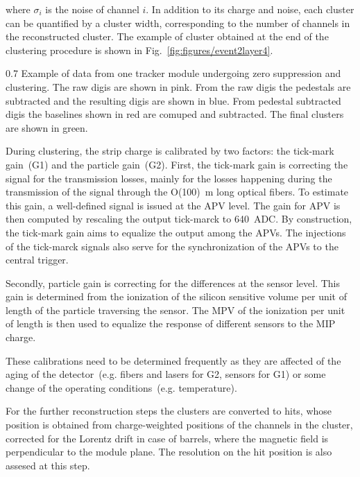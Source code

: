 where $\sigma_{i}$ is the noise of channel $i$. In addition to its charge and noise, each cluster can be quantified by a cluster width, corresponding to the number of channels in the reconstructed cluster. The example of cluster obtained at the end of the clustering procedure is shown in Fig.~\ref{fig:figures/event2layer4}.

                 {0.7}       %
                 {Example of data from one tracker module undergoing zero suppression and clustering. The raw digis are shown in pink. From the raw digis the pedestals are subtracted and the resulting digis are shown in blue. From pedestal subtracted digis the baselines shown in red are comuped and subtracted. The final clusters are shown in green.} %


During clustering, the strip charge is calibrated by two factors: the tick-mark gain~(G1) and the particle gain~(G2). First, the tick-mark gain is correcting the signal for the transmission losses, mainly for the losses happening during the transmission of the signal through the O(100)~m long optical fibers. To estimate this gain, a well-defined signal is issued at the APV level. The gain for APV is then computed by rescaling the output tick-marck to 640~ADC. By construction, the tick-mark gain aims to equalize the output among the APVs. The injections of the tick-marck signals also serve for the synchronization of the APVs to the central trigger.

Secondly, particle gain is correcting for the differences at the sensor level. This gain is determined from the ionization of the silicon sensitive volume per unit of length of the particle traversing the sensor. The MPV of the ionization per unit of length is then used to equalize the response of different sensors to the MIP charge. 

These calibrations need to be determined frequently as they are affected of the aging of the detector~(e.g. fibers and lasers for G2,  sensors for G1) or some change of the operating conditions~(e.g. temperature).

For the further reconstruction steps the clusters are converted to hits, whose position is obtained from charge-weighted positions of the channels in the cluster, corrected for the Lorentz drift in case of barrels, where the magnetic field is perpendicular to the module plane. The resolution on the hit position is also assesed at this step.


